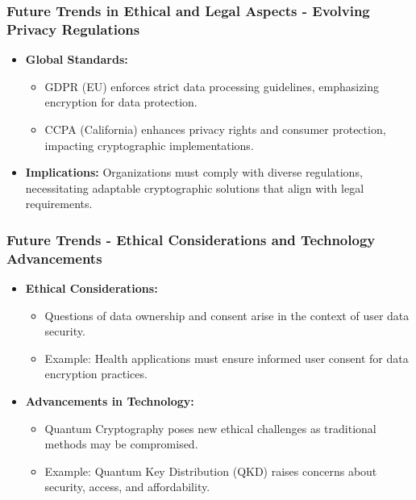 \documentclass{beamer}
\begin{document}
\begin{frame}[fragile]
  \frametitle{Future Trends in Ethical and Legal Aspects - Evolving Privacy Regulations}
  \begin{itemize}
    \item \textbf{Global Standards:}
    \begin{itemize}
      \item GDPR (EU) enforces strict data processing guidelines, emphasizing encryption for data protection.
      \item CCPA (California) enhances privacy rights and consumer protection, impacting cryptographic implementations.
    \end{itemize}
    \item \textbf{Implications:} 
    Organizations must comply with diverse regulations, necessitating adaptable cryptographic solutions that align with legal requirements.
  \end{itemize}
\end{frame}

\begin{frame}[fragile]
  \frametitle{Future Trends - Ethical Considerations and Technology Advancements}
  \begin{itemize}
    \item \textbf{Ethical Considerations:}
    \begin{itemize}
      \item Questions of data ownership and consent arise in the context of user data security.
      \item Example: Health applications must ensure informed user consent for data encryption practices.
    \end{itemize}
    
    \item \textbf{Advancements in Technology:}
    \begin{itemize}
      \item Quantum Cryptography poses new ethical challenges as traditional methods may be compromised.
      \item Example: Quantum Key Distribution (QKD) raises concerns about security, access, and affordability.
    \end{itemize}
  \end{itemize}
\end{frame}
\end{document}

